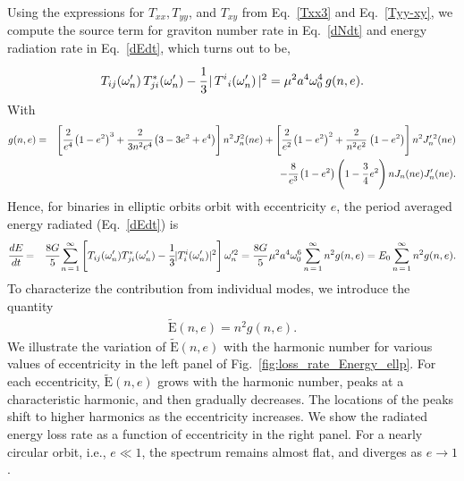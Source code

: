 \documentclass[aps,prd]{revtex4-2}
\begin{document}
Using the expressions for $T_{xx}, T_{yy}$, and $T_{xy}$ from Eq.~\eqref{Txx3} and Eq.~\eqref{Tyy-xy}, we compute the source term for graviton number rate in Eq.~\eqref{dNdt} and energy radiation rate in Eq.~\eqref{dEdt}, which turns out to be,
\begin{eqnarray}
    T_{ij}(\omega_n^\prime)\,T^*_{ji}(\omega_n^\prime)-\cfrac{1}{3}\,|\,T^{i}{}_{i}(\omega_n^\prime)\,|^2 = \mu^2 a^4 \omega_0^4 \,g(n, e).
\end{eqnarray}
With
\begin{eqnarray}
	g(n,e) &=& \left[\cfrac{2}{e^{4}}\left(1-e^{2}\right)^3 + \cfrac{2}{3n^{2} e^{4}}\left(3 -3e^{2} + e^{4}\right)\right]n^{2} J^{2}_{n}(ne) \nonumber + \left[\cfrac{2}{e^{2}}\left(1-e^{2}\right)^{2} + \cfrac{2}{n^{2} e^{2}}\,\left(1-e^{2}\right)\right]n^{2}J^{\prime\,2}_{n}(ne) \nonumber \\ && - \cfrac{8}{e^{3}}\left(1-e^{2}\right)\left(1-\cfrac{3}{4}\,e^{2}\right)n J_{n}(ne) J^{\prime}_{n}(ne).
\end{eqnarray}
Hence, for binaries in elliptic orbits orbit with eccentricity $e$,  the period averaged energy radiated (Eq.~\eqref{dEdt}) is
\begin{eqnarray}\label{dEdt-4}
	\cfrac{dE}{dt} &=&  \cfrac{8G}{5}  \sum_{n\, =\, 1}^\infty\left[T_{ij}(\omega_{n}^{\prime})T_{ji}^{*}(\omega_{n}^{\prime}) - \cfrac{1}{3}|T^{i}_{i}(\omega_{n}^{\prime})|^2\right] \omega_{n}^{\prime 2}
	 =  \cfrac{8G}{5}\,\mu^{2} a^{4} \omega_0^{6}\sum_{n\, =\, 1}^{\infty} n^{2} g(n,e)= E_{0}\sum_{n\,=\,1}^{\infty} n^2 g(n, e).
\end{eqnarray}
To characterize the contribution from individual modes, we introduce the quantity
\begin{eqnarray}
    \tilde{\mathrm E}(n,e) = n^2 g(n, e).
\end{eqnarray}
We illustrate the variation of $ \tilde{\mathrm E}(n,e)$ with the harmonic number for various values of eccentricity in the left panel of Fig.~\ref{fig:loss_rate_Energy_ellp}. For each eccentricity, $ \tilde{\mathrm E}(n,e)$ grows with the harmonic number, peaks at a characteristic harmonic, and then gradually decreases. The locations of the peaks shift to higher harmonics as the eccentricity increases. We show the radiated energy loss rate as a function of eccentricity in the right panel. For a nearly circular orbit, i.e., $e\ll 1$, the spectrum remains almost flat, and diverges as $e\to 1$. 
\end{document}
